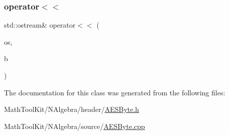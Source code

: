 \mbox{\label{class_a_e_s_byte_a6e506ef4c13b155606735a48f7bb3bb9}} 
\subsubsection{\texorpdfstring{operator$<$$<$}{operator<<}}
{\footnotesize\ttfamily std\+::ostream\& operator$<$$<$ (\begin{DoxyParamCaption}\item[{std\+::ostream \&}]{os,  }\item[{const \mbox{\hyperlink{class_a_e_s_byte}{A\+E\+S\+Byte}} \&}]{b }\end{DoxyParamCaption})\hspace{0.3cm}{\ttfamily [friend]}}



The documentation for this class was generated from the following files\+:\begin{DoxyCompactItemize}
\item 
Math\+Tool\+Kit/\+N\+Algebra/header/\mbox{\hyperlink{_a_e_s_byte_8h}{A\+E\+S\+Byte.\+h}}\item 
Math\+Tool\+Kit/\+N\+Algebra/source/\mbox{\hyperlink{_a_e_s_byte_8cpp}{A\+E\+S\+Byte.\+cpp}}\end{DoxyCompactItemize}
